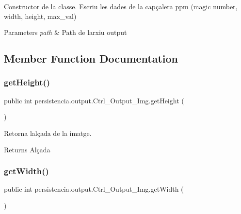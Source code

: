 Constructor de la classe. Escriu les dades de la capçalera ppm (magic number, width, height, max\+\_\+val) 


\begin{DoxyParams}{Parameters}
{\em path} & Path de l\textquotesingle{}arxiu output \\
\hline
\end{DoxyParams}


\subsection{Member Function Documentation}
\mbox{\label{classpersistencia_1_1output_1_1Ctrl__Output__Img_a736bcf38410d875d9b4a17fd2a95cc4d}} 
\subsubsection{\texorpdfstring{get\+Height()}{getHeight()}}
{\footnotesize\ttfamily public int persistencia.\+output.\+Ctrl\+\_\+\+Output\+\_\+\+Img.\+get\+Height (\begin{DoxyParamCaption}{ }\end{DoxyParamCaption})\hspace{0.3cm}{\ttfamily [inline]}}



Retorna l\textquotesingle{}alçada de la imatge. 

\begin{DoxyReturn}{Returns}
Alçada 
\end{DoxyReturn}
\mbox{\label{classpersistencia_1_1output_1_1Ctrl__Output__Img_ab6e88e466e6b7d7d847be2ac9c26c529}} 
\subsubsection{\texorpdfstring{get\+Width()}{getWidth()}}
{\footnotesize\ttfamily public int persistencia.\+output.\+Ctrl\+\_\+\+Output\+\_\+\+Img.\+get\+Width (\begin{DoxyParamCaption}{ }\end{DoxyParamCaption})\hspace{0.3cm}{\ttfamily [inline]}}



